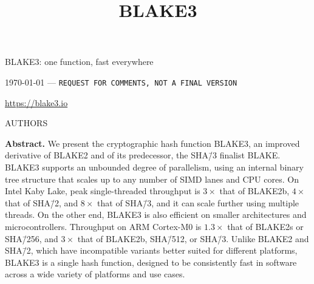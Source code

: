 \documentclass[11pt,notitlepage,a4paper]{article}
\title{BLAKE3}
\begin{document}
\selectfont

\pagestyle{plain}

\begin{center}
{\huge BLAKE3: one function, fast everywhere}

\bigskip

\mydate\today 
\quad---\quad
{\large \tt REQUEST FOR COMMENTS, NOT A FINAL VERSION}

\medskip

\url{https://blake3.io}

\medskip

AUTHORS
\end{center}


\medskip

\begin{center}
  \begin{minipage}{0.92\linewidth}

      \textbf{Abstract.} We present the cryptographic hash function BLAKE3, an
      improved derivative of BLAKE2 and of its predecessor, the SHA\=/3 finalist
      BLAKE. BLAKE3 supports an unbounded degree of parallelism, using an internal
      binary tree structure that scales up to any number of SIMD lanes and CPU cores.
      On Intel Kaby Lake, peak single-threaded throughput is $3\times$ that of
      BLAKE2b, $4\times$ that of SHA\=/2, and $8\times$ that of SHA\=/3, and it can scale
      further using multiple threads. On the other end, BLAKE3 is also efficient on
      smaller architectures and microcontrollers. Throughput on ARM Cortex-M0
      is $1.3\times$ that of BLAKE2s or SHA\=/256, and $3\times$ that of BLAKE2b,
      SHA\=/512, or SHA\=/3. Unlike BLAKE2 and SHA\=/2, which have incompatible
      variants better suited for different platforms, BLAKE3 is a single hash
      function, designed to be consistently fast in software across a wide
      variety of platforms and use cases.

   \end{minipage}
\end{center}
\end{document}
